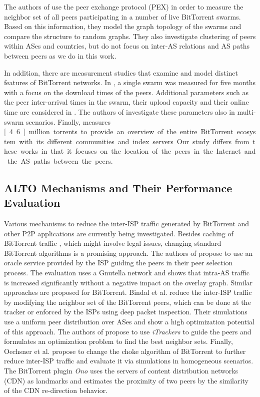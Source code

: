 The authors of \cite{Kryczka2011} use the peer exchange protocol (PEX) in order to measure the neighbor set of all peers participating in a number of live BitTorrent swarms. Based on this information, they model the graph topology of the swarms and compare the structure to random graphs. They also investigate clustering of peers within ASes and countries, but do not focus on inter-AS relations and AS paths between peers as we do in this work.

In addition, there are measurement studies that examine and model distinct features of BitTorrent networks. In \cite{Izal2004}, a single swarm was measured for five months with a focus on the download times of the peers. Additional parameters such as the peer inter-arrival times in the swarm, their upload capacity and their online time are considered in \cite{Pouwelse2005}. The authors of \cite{Guo2005} investigate these parameters also in multi-swarm scenarios. Finally, \cite{Zhang2010} measures \unit[4.6]{million} torrents to provide an overview of the entire BitTorrent ecosystem with its different communities and index servers. Our study differs from these works in that it focuses on the location of the peers in the Internet and the AS paths between the peers. 

\subsection{ALTO Mechanisms and Their Performance Evaluation}

Various mechanisms to reduce the inter-ISP traffic generated by BitTorrent and other P2P applications are currently being investigated. Besides caching of BitTorrent traffic \cite{Lehrieder2010a,Lehrieder2012,Pacifici2012}, which might involve legal issues, changing standard BitTorrent algorithms is a promising approach. The authors of \cite{Aggarwal2007} propose to use an oracle service provided by the ISP guiding the peers in their peer selection process. The evaluation uses a Gnutella network and shows that intra-AS traffic is increased significantly without a negative impact on the overlay graph. Similar approaches are proposed for BitTorrent. Bindal et al. \cite{Bindal2006} reduce the inter-ISP traffic by modifying the neighbor set of the BitTorrent peers, which can be done at the tracker or enforced by the ISPs using deep packet inspection. Their simulations use a uniform peer distribution over ASes and show a high optimization potential of this approach. The authors of \cite{Xie2008} propose to use \emph{iTrackers} to guide the peers and formulates an optimization problem to find the best neighbor sets. Finally, Oechsner et al. \cite{Oechsner2009} propose to change the choke algorithm of BitTorrent to further reduce inter-ISP traffic and evaluate it via simulations in homogeneous scenarios. The BitTorrent plugin \emph{Ono} \cite{Choffnes2008} uses the servers of content distribution networks (CDN) as landmarks and estimates the proximity of two peers by the similarity of the CDN re-direction behavior.

